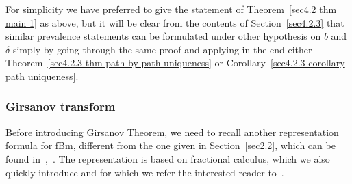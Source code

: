 \documentclass[10pt]{article}
\begin{document}
\begin{remark}
  For simplicity we have preferred to give the statement of
  Theorem~\ref{sec4.2 thm main 1} as above, but it will be clear from the
  contents of Section~\ref{sec4.2.3} that similar prevalence statements can be
  formulated under other hypothesis on $b$ and $\delta$ simply by going
  through the same proof and applying in the end either Theorem~\ref{sec4.2.3
  thm path-by-path uniqueness} or Corollary~\ref{sec4.2.3 corollary path
  uniqueness}.
\end{remark}

\subsubsection{Girsanov transform}\label{sec4.2.2}

Before introducing Girsanov Theorem, we need to recall another representation
formula for fBm, different from the one given in Section~\ref{sec2.2}, which
can be found in~{\cite{nualart2006}},~{\cite{picard}}. The representation is
based on fractional calculus, which we also quickly introduce and for which we
refer the interested reader to~{\cite{samko}}.
\end{document}

